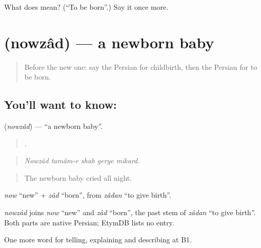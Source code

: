 \begin{tcolorbox}[breakable,colback=teal!4,colframe=teal!35!black,title={Before you move on}]
What does    mean? (\textquotedblleft{}To be born\textquotedblright{}.) Say it once more.
\end{tcolorbox}
\section[\texorpdfstring{\fa{نوزاد} (nowzâd)}{نوزاد (nowzâd)}]{ (nowzâd) — a newborn baby}

\label{lesson:FA-C332-nowzad}



\begin{quote}
Before the new one: say the Persian for childbirth, then the Persian for to be born.
\end{quote}

\subsection*{You'll want to know: }
\textbf{} (\emph{nowzâd}) — \textquotedblleft{}a newborn baby\textquotedblright{}.

\begin{quote}
    .
\end{quote}

\begin{quote}
\emph{Nowzâd tamâm-e shab gerye mikard.}
\end{quote}

\begin{quote}
The newborn baby cried all night.
\end{quote}

\emph{now} \textquotedblleft{}new\textquotedblright{} + \emph{zâd} \textquotedblleft{}born\textquotedblright{}, from \emph{zâdan} \textquotedblleft{}to give birth\textquotedblright{}.

\begin{cousinweb}
\emph{nowzâd} joins \emph{now} \textquotedblleft{}new\textquotedblright{} and \emph{zâd} \textquotedblleft{}born\textquotedblright{}, the past stem of \emph{zâdan} \textquotedblleft{}to give birth\textquotedblright{}. Both parts are native Persian; EtymDB lists no entry.
\end{cousinweb}

\begin{grammarlens}[title={What you've built}]
One more word for telling, explaining and describing at B1.
\end{grammarlens}

